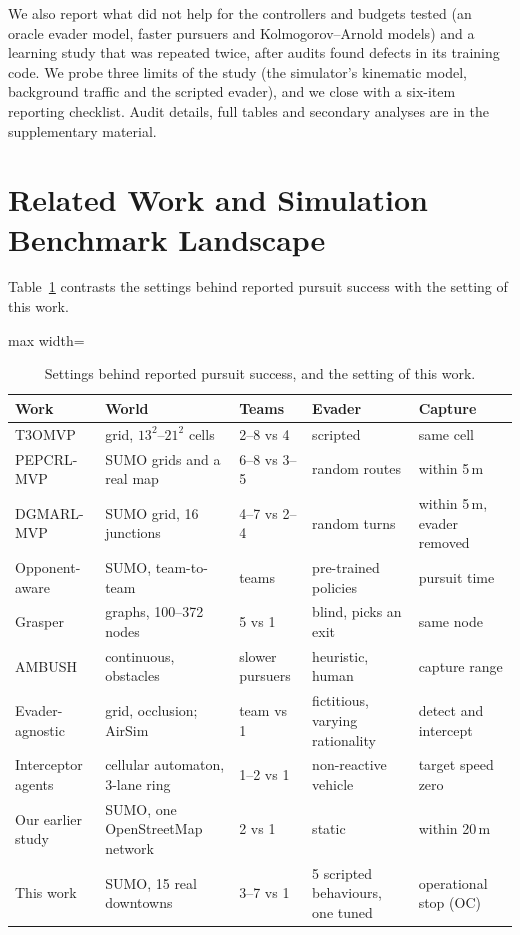 \documentclass[5p,twocolumn]{elsarticle}
\begin{document}
We also report what did not help for the controllers and budgets tested (an oracle evader model, faster pursuers and
Kolmogorov--Arnold models) and a learning study that was repeated twice, after audits found defects in its training
code. We probe three limits of the study (the simulator's kinematic model, background traffic and the scripted
evader), and we close with a six-item reporting checklist. Audit details, full tables and secondary analyses are in
the supplementary material.

\section{Related Work and Simulation Benchmark Landscape}
\label{sec:related}

Table~\ref{tab:settings} contrasts the settings behind reported pursuit success with the setting of this work.

\begin{table}[!t]
\centering
\caption{Settings behind reported pursuit success, and the setting of this work.}
\label{tab:settings}
\small
\setlength{\tabcolsep}{4pt}
\begin{adjustbox}{max width=\textwidth}
\begin{tabular}{@{}lllll@{}}
\toprule
Work & World & Teams & Evader & Capture \\
\midrule
T3OMVP \cite{yuan2022t3omvp} & grid, $13^2$--$21^2$ cells & 2--8 vs 4 & scripted & same cell \\
PEPCRL-MVP \cite{li2024pepcrl} & SUMO grids and a real map & 6--8 vs 3--5 & random routes & within 5\,m \\
DGMARL-MVP \cite{li2023dgmarl} & SUMO grid, 16 junctions & 4--7 vs 2--4 & random turns & within 5\,m, evader removed \\
Opponent-aware \cite{wang2022opponent} & SUMO, team-to-team & teams & pre-trained policies & pursuit time \\
Grasper \cite{li2024grasper} & graphs, 100--372 nodes & 5 vs 1 & blind, picks an exit & same node \\
AMBUSH \cite{chen2026ambush} & continuous, obstacles & slower pursuers & heuristic, human & capture range \\
Evader-agnostic \cite{kalanther2025evader} & grid, occlusion; AirSim & team vs 1 & fictitious, varying rationality & detect and intercept \\
Interceptor agents \cite{bykov2025interceptor} & cellular automaton, 3-lane ring & 1--2 vs 1 & non-reactive vehicle & target speed zero \\
Our earlier study \cite{noguera2025kan} & SUMO, one OpenStreetMap network & 2 vs 1 & static & within 20\,m \\
This work & SUMO, 15 real downtowns & 3--7 vs 1 & 5 scripted behaviours, one tuned & operational stop (OC) \\
\bottomrule
\end{tabular}
\end{adjustbox}
\end{table}
\end{document}
